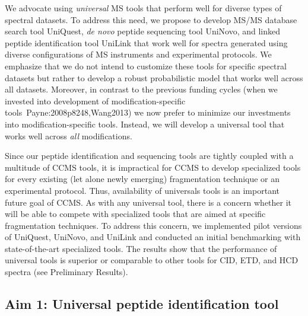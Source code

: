 We advocate using {\em universal}  MS tools that perform well for diverse types of spectral datasets. %
To address this need, we propose to develop MS/MS database search tool UniQuest,  {\em de novo} peptide sequencing tool UniNovo, and linked peptide identification tool UniLink that work well
for spectra generated using diverse configurations of MS instruments and experimental protocols. 
We emphasize that we do not intend to customize these tools for specific spectral datasets but rather to develop a robust probabilistic model that works well across all datasets.  Moreover, in contrast to the previous funding cycles (when we invested into development of modification-specific tools~\cite{unv}{Payne:2008p8248,Wang2013}) we now prefer to minimize our investments 
into  modification-specific tools. Instead, we will develop a universal tool that works well across {\em all} modifications. 

Since our peptide identification and sequencing tools are tightly coupled with a multitude of CCMS tools, it is impractical for CCMS to develop specialized tools for every existing (let alone newly emerging) fragmentation technique or an experimental protocol. Thus, availability of universals tools is an important future goal of CCMS. 
As with any universal tool, there is a concern whether it will be able to compete with specialized tools that are aimed at specific fragmentation techniques.  To address this concern, we implemented pilot versions of UniQuest, UniNovo, and UniLink  and conducted an initial benchmarking with state-of-the-art specialized tools.
The results show that the performance of universal tools is superior or comparable  to other tools  for CID, ETD,  and HCD spectra (see Preliminary Results).  

\subsection{Aim 1: Universal peptide identification tool} 

